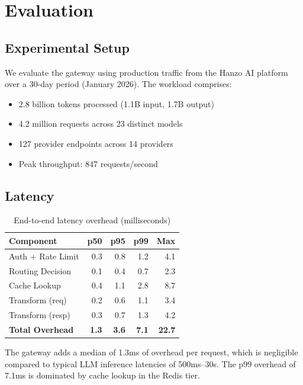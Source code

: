 \section{Evaluation}

\label{sec:evaluation}

\subsection{Experimental Setup}

We evaluate the gateway using production traffic from the Hanzo AI platform over a 30-day period (January 2026). The workload comprises:

\begin{itemize}[leftmargin=*]
    \item 2.8 billion tokens processed (1.1B input, 1.7B output)
    \item 4.2 million requests across 23 distinct models
    \item 127 provider endpoints across 14 providers
    \item Peak throughput: 847 requests/second
\end{itemize}

\subsection{Latency}

\begin{table}[t]
\centering
\caption{End-to-end latency overhead (milliseconds)}
\label{tab:latency}
\begin{tabular}{@{}lrrrr@{}}
\toprule
\textbf{Component} & \textbf{p50} & \textbf{p95} & \textbf{p99} & \textbf{Max} \\
\midrule
Auth + Rate Limit & 0.3 & 0.8 & 1.2 & 4.1 \\
Routing Decision & 0.1 & 0.4 & 0.7 & 2.3 \\
Cache Lookup & 0.4 & 1.1 & 2.8 & 8.7 \\
Transform (req) & 0.2 & 0.6 & 1.1 & 3.4 \\
Transform (resp) & 0.3 & 0.7 & 1.3 & 4.2 \\
\midrule
\textbf{Total Overhead} & \textbf{1.3} & \textbf{3.6} & \textbf{7.1} & \textbf{22.7} \\
\bottomrule
\end{tabular}
\end{table}

The gateway adds a median of 1.3ms of overhead per request, which is negligible compared to typical LLM inference latencies of 500ms--30s. The p99 overhead of 7.1ms is dominated by cache lookup in the Redis tier.

